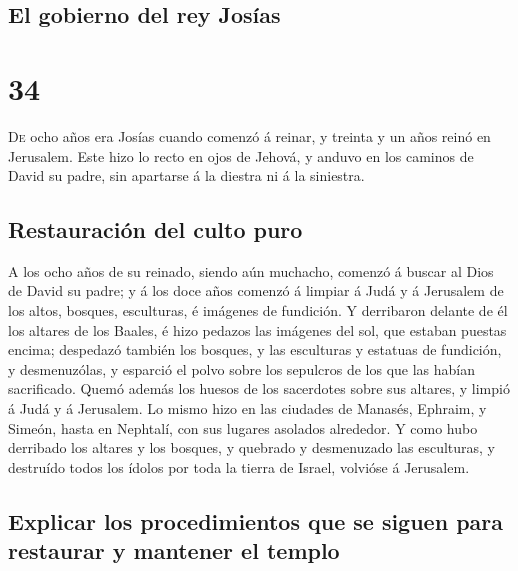 \hypertarget{el-gobierno-del-rey-josuxedas}{%
\subsection{El gobierno del rey
Josías}\label{el-gobierno-del-rey-josuxedas}}

\hypertarget{section-33}{%
\section{34}\label{section-33}}

 \textsc{De} ocho años era Josías cuando comenzó á reinar,
y treinta y un años reinó en Jerusalem.  Este hizo lo
recto en ojos de Jehová, y anduvo en los caminos de David su padre, sin
apartarse á la diestra ni á la siniestra.

\hypertarget{restauraciuxf3n-del-culto-puro}{%
\subsection{Restauración del culto
puro}\label{restauraciuxf3n-del-culto-puro}}

 A los ocho años de su reinado, siendo aún muchacho,
comenzó á buscar al Dios de David su padre; y á los doce años comenzó á
limpiar á Judá y á Jerusalem de los altos, bosques, esculturas, é
imágenes de fundición.  Y derribaron delante de él los
altares de los Baales, é hizo pedazos las imágenes del sol, que estaban
puestas encima; despedazó también los bosques, y las esculturas y
estatuas de fundición, y desmenuzólas, y esparció el polvo sobre los
sepulcros de los que las habían sacrificado.  Quemó además
los huesos de los sacerdotes sobre sus altares, y limpió á Judá y á
Jerusalem.  Lo mismo hizo en las ciudades de Manasés,
Ephraim, y Simeón, hasta en Nephtalí, con sus lugares asolados
alrededor.  Y como hubo derribado los altares y los
bosques, y quebrado y desmenuzado las esculturas, y destruído todos los
ídolos por toda la tierra de Israel, volvióse á Jerusalem.

\hypertarget{explicar-los-procedimientos-que-se-siguen-para-restaurar-y-mantener-el-templo}{%
\subsection{Explicar los procedimientos que se siguen para restaurar y
mantener el
templo}\label{explicar-los-procedimientos-que-se-siguen-para-restaurar-y-mantener-el-templo}}


